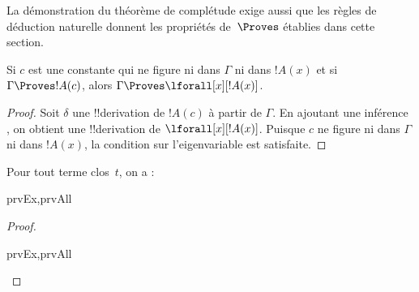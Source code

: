 \documentclass[../../../include/open-logic-section]{subfiles}
\begin{document}


\begin{explain}
La démonstration du théorème de complétude exige aussi que les
règles de déduction naturelle donnent les propriétés de~$\Proves$
établies dans cette section.
\end{explain}

\begin{thm}
 Si $c$ est une constante qui ne
figure ni dans $\Gamma$ ni dans $!A(x)$ et si $\Gamma \Proves !A(c)$,
alors $\Gamma \Proves \lforall[x][!A(x)]$.
\end{thm}

\begin{proof}
Soit $\delta$ une !!{derivation} de $!A(c)$ à partir de $\Gamma$.
En ajoutant une inférence \Intro{\lforall}, on obtient une
!!{derivation} de $\lforall[x][!A(x)]$. Puisque $c$ ne figure ni
dans $\Gamma$ ni dans $!A(x)$, la condition sur l'eigenvariable
est satisfaite.
\end{proof}

\begin{prop}
Pour tout terme clos~$t$, on a :
\begin{tagenumerate}{prvEx,prvAll}

\end{tagenumerate}
\end{prop}

\begin{proof}
\begin{tagenumerate}{prvEx,prvAll}

\end{tagenumerate}
\end{proof}
%
%
%
%
%
\end{document}
